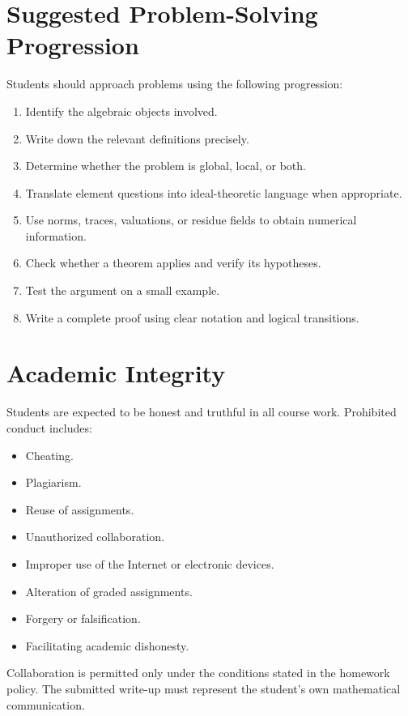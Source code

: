 \documentclass[11pt]{article}
\begin{document}
\section{Suggested Problem-Solving Progression}

Students should approach problems using the following progression:

\begin{enumerate}
    \item Identify the algebraic objects involved.
    \item Write down the relevant definitions precisely.
    \item Determine whether the problem is global, local, or both.
    \item Translate element questions into ideal-theoretic language when
          appropriate.
    \item Use norms, traces, valuations, or residue fields to obtain
          numerical information.
    \item Check whether a theorem applies and verify its hypotheses.
    \item Test the argument on a small example.
    \item Write a complete proof using clear notation and logical transitions.
\end{enumerate}

\section{Academic Integrity}

Students are expected to be honest and truthful in all course work. Prohibited
conduct includes:

\begin{itemize}
    \item Cheating.
    \item Plagiarism.
    \item Reuse of assignments.
    \item Unauthorized collaboration.
    \item Improper use of the Internet or electronic devices.
    \item Alteration of graded assignments.
    \item Forgery or falsification.
    \item Facilitating academic dishonesty.
\end{itemize}

Collaboration is permitted only under the conditions stated in the homework
policy. The submitted write-up must represent the student's own mathematical
communication.
\end{document}
